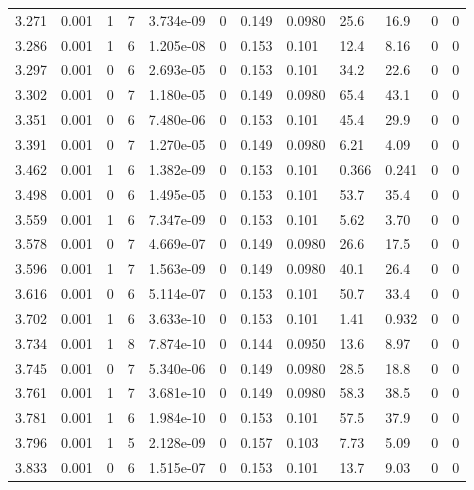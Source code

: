 \documentclass[preview]{standalone}
\begin{document}
{{{{\begin{tabular}{L{1.2cm}C{1.2cm} C{0.3cm}C{0.5cm} C{1.4cm}C{1.4cm} C{1.4cm}C{1.4cm} C{1.6cm}C{1.6cm} C{1.6cm}C{1.6cm}}
  3.271  &  0.001  & 1     &  7 &  3.734e-09  & 0  &  0.149&   0.0980& 25.6 & 16.9   &  0 & 0  \\ 
  3.286  &  0.001  & 1     &  6 &  1.205e-08  & 0  &  0.153&   0.101& 12.4 & 8.16   &  0 & 0  \\ 
  3.297  &  0.001  & 0     &  6 &  2.693e-05  & 0  &  0.153&   0.101& 34.2 & 22.6   &  0 & 0  \\ 
  3.302  &  0.001  & 0     &  7 &  1.180e-05  & 0  &  0.149&   0.0980& 65.4 & 43.1   &  0 & 0  \\ 
  3.351  &  0.001  & 0     &  6 &  7.480e-06  & 0  &  0.153&   0.101& 45.4 & 29.9   &  0 & 0  \\ 
  3.391  &  0.001  & 0     &  7 &  1.270e-05  & 0  &  0.149&   0.0980& 6.21 & 4.09   &  0 & 0  \\ 
  3.462  &  0.001  & 1     &  6 &  1.382e-09  & 0  &  0.153&   0.101& 0.366 & 0.241   &  0 & 0  \\ 
  3.498  &  0.001  & 0     &  6 &  1.495e-05  & 0  &  0.153&   0.101& 53.7 & 35.4   &  0 & 0  \\ 
  3.559  &  0.001  & 1     &  6 &  7.347e-09  & 0  &  0.153&   0.101& 5.62 & 3.70   &  0 & 0  \\ 
  3.578  &  0.001  & 0     &  7 &  4.669e-07  & 0  &  0.149&   0.0980& 26.6 & 17.5   &  0 & 0  \\ 
  3.596  &  0.001  & 1     &  7 &  1.563e-09  & 0  &  0.149&   0.0980& 40.1 & 26.4   &  0 & 0  \\ 
  3.616  &  0.001  & 0     &  6 &  5.114e-07  & 0  &  0.153&   0.101& 50.7 & 33.4   &  0 & 0  \\ 
  3.702  &  0.001  & 1     &  6 &  3.633e-10  & 0  &  0.153&   0.101& 1.41 & 0.932   &  0 & 0  \\ 
  3.734  &  0.001  & 1     &  8 &  7.874e-10  & 0  &  0.144&   0.0950& 13.6 & 8.97   &  0 & 0  \\ 
  3.745  &  0.001  & 0     &  7 &  5.340e-06  & 0  &  0.149&   0.0980& 28.5 & 18.8   &  0 & 0  \\ 
  3.761  &  0.001  & 1     &  7 &  3.681e-10  & 0  &  0.149&   0.0980& 58.3 & 38.5   &  0 & 0  \\ 
  3.781  &  0.001  & 1     &  6 &  1.984e-10  & 0  &  0.153&   0.101& 57.5 & 37.9   &  0 & 0  \\ 
  3.796  &  0.001  & 1     &  5 &  2.128e-09  & 0  &  0.157&   0.103& 7.73 & 5.09   &  0 & 0  \\ 
  3.833  &  0.001  & 0     &  6 &  1.515e-07  & 0  &  0.153&   0.101& 13.7 & 9.03   &  0 & 0  \\ 

\end{tabular}}}}}
\end{document}
